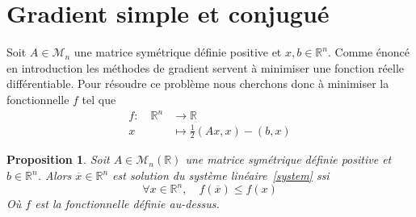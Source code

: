 \documentclass[twoside,12pt]{report}
\newtheorem{prop}{Proposition}
\theoremstyle{remark}
\begin{document}
\section{Gradient simple et conjugué}
Soit $A \in \mathcal{M}_n$ une matrice symétrique définie positive et $x,b \in \mathbb{R}^n$. Comme énoncé en introduction les méthodes de gradient servent à minimiser une fonction réelle différentiable. Pour résoudre ce problème nous cherchons donc à minimiser la fonctionnelle $f$ tel que
\begin{align}
f :\quad \mathbb{R}^{n} &\to \mathbb{R} \\
x &\mapsto \frac{1}{2}(Ax,x)-(b,x) \nonumber
\end{align}

\begin{prop}
Soit $A \in \mathcal{M}_n(\mathbb{R})$ une matrice symétrique définie positive et $b \in \mathbb{R}^n$. Alors $\overline{x}\in \mathbb{R}^n$ est solution du système linéaire~\eqref{system} ssi
\begin{equation*}
\forall x \in \mathbb{R}^n, \quad f(\overline{x}) \leq f(x)
\end{equation*}
Où $f$ est la fonctionnelle définie au-dessus.
\end{prop}
\end{document}
